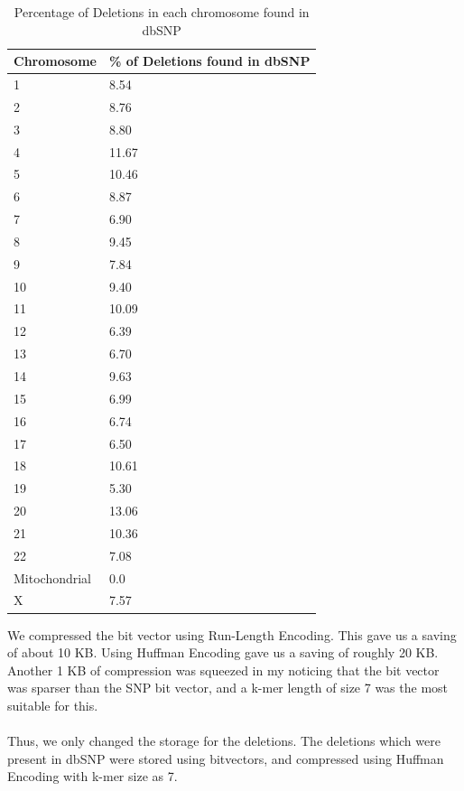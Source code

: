 \documentclass{article}
\begin{document}
\begin{center}
  \begin{table}[h]
  	\begin{tabular}{|p{1in}|p{1in}|}
	
	\hline
	Chromosome	&		\% of Deletions found in dbSNP \\
	\hline
	1	&		8.54 \\
	\hline
	2	&		8.76 \\
	\hline
	3	&		8.80 \\
	\hline
	4	&	11.67 \\
	\hline
	5	&	10.46 \\
	\hline
	6	&	8.87 \\
	\hline
	7	&	6.90 \\
	\hline
	8	&	9.45 \\
	\hline
	9	&	7.84 \\
	\hline
	10	&	9.40 \\
	\hline
	11	&	10.09 \\
	\hline
	12	&	6.39 \\
	\hline
	13	&	6.70 \\
	\hline
	14	&	9.63 \\
	\hline
	15	&	6.99 \\
	\hline
	16	&	6.74 \\	
	\hline
	17	&	6.50 \\
	\hline	
	18	&	10.61 \\
	\hline	
	19	&	5.30 \\
	\hline
	20	&	13.06 \\	
	\hline
	21	&	10.36 \\
	\hline
	22	&	7.08  \\
	\hline
	Mitochondrial	&	0.0 \\
	\hline
	X	&	7.57 \\
	\hline
	\end{tabular}
  \caption {Percentage of Deletions in each chromosome found in dbSNP}
  \end{table}
\end{center}


We compressed the bit vector using Run-Length Encoding. This gave us a saving of about 10 KB. Using Huffman Encoding gave us a saving of roughly 20 KB. Another 1 KB of compression was squeezed in my noticing that the bit vector was sparser than the SNP bit vector, and a k-mer length of size 7 was the most suitable for this.\\ 
\\
Thus, we only changed the storage for the deletions. The deletions which were present in dbSNP were stored using bitvectors, and compressed using Huffman Encoding with k-mer size as 7.
\clearpage
\end{document}
